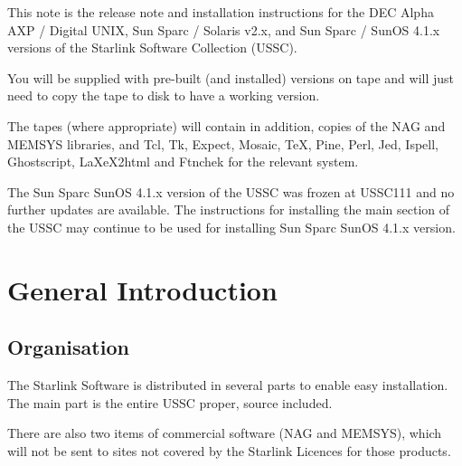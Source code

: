 
This note is the release note and installation instructions for the
DEC Alpha AXP / Digital UNIX, Sun Sparc / Solaris v2.x, and Sun Sparc /
SunOS 4.1.x versions of the Starlink Software Collection (USSC).

You will be supplied with pre-built (and installed) versions on tape
and will just need to copy the tape to disk to have a working version.

The tapes (where appropriate) will contain in addition, copies of the
NAG and MEMSYS libraries, and Tcl, Tk, Expect, Mosaic, TeX, Pine, Perl,
Jed, Ispell, Ghostscript, LaXeX2html and Ftnchek for the relevant system.

The Sun Sparc SunOS 4.1.x version of the USSC was frozen at USSC111 and
no further updates are available.  The instructions for installing the
main section of the USSC may continue to be used for installing Sun
Sparc SunOS 4.1.x version.


 \newpage
 \begin{latexonly}
   \setlength{\parskip}{0mm}
   \latexonlytoc
   \setlength{\parskip}{\medskipamount}
   \markright{\stardocname}
 \end{latexonly}
\newpage
\renewcommand{\thepage}{\arabic{page}}
 \setcounter{page}{1}

\section{General Introduction}
\label{s:intro}

\subsection{Organisation}
\label{s:intro:organ}

The Starlink Software is distributed in several parts to enable easy
installation.  The main part is the entire USSC proper, source included.

There are also two items of commercial software (NAG and MEMSYS), which
will not be sent to sites not covered by the Starlink Licences for those
products.

